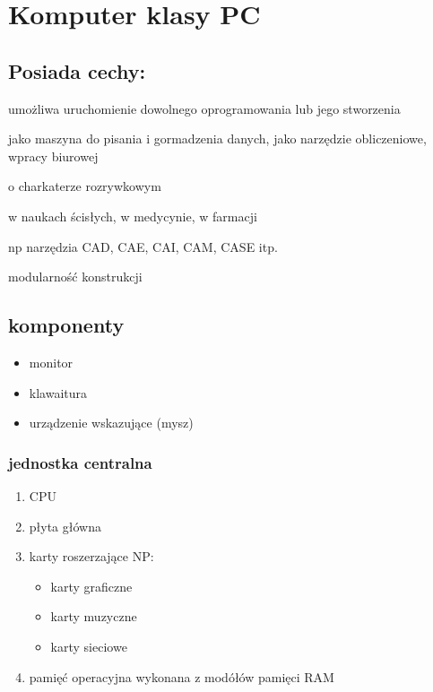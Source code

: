 \documentclass[11pt]{article}
\begin{document}
\section{Komputer klasy PC}
\label{sec:org88c9c07}
\subsection{Posiada cechy:}
\label{sec:org6f2ee90}
\begin{description}
\item[{porgramowalność}] umożliwa uruchomienie dowolnego oprogramowania lub jego stworzenia
\item[{uniwersalne zastosowania}] \begin{description}
\item[{typowo użytkowe}] jako maszyna do pisania i gormadzenia danych, jako narzędzie obliczeniowe, wpracy biurowej
\item o charkaterze rozrywkowym
\item[{badawczo-naukowe}] w naukach ścisłych, w medycynie, w farmacji
\item[{wspomagające projektowanie}] np narzędzia CAD, CAE, CAI, CAM, CASE itp.
\end{description}
\item modularność konstrukcji
\end{description}
\subsection{komponenty}
\label{sec:org3799e1f}
\begin{itemize}
\item monitor
\item klawaitura
\item urządzenie wskazujące (mysz)
\end{itemize}
\subsubsection{jednostka centralna}
\label{sec:org305812b}
\begin{enumerate}
\item CPU
\label{sec:org613936f}
\item płyta główna
\label{sec:orgd233f4a}
\item karty roszerzające
\label{sec:org404a571}
NP:
\begin{itemize}
\item karty graficzne
\item karty muzyczne
\item karty sieciowe
\end{itemize}
\item pamięć operacyjna
\label{sec:org48f6c9e}
wykonana z modółów pamięci RAM
\end{enumerate}
\end{document}
